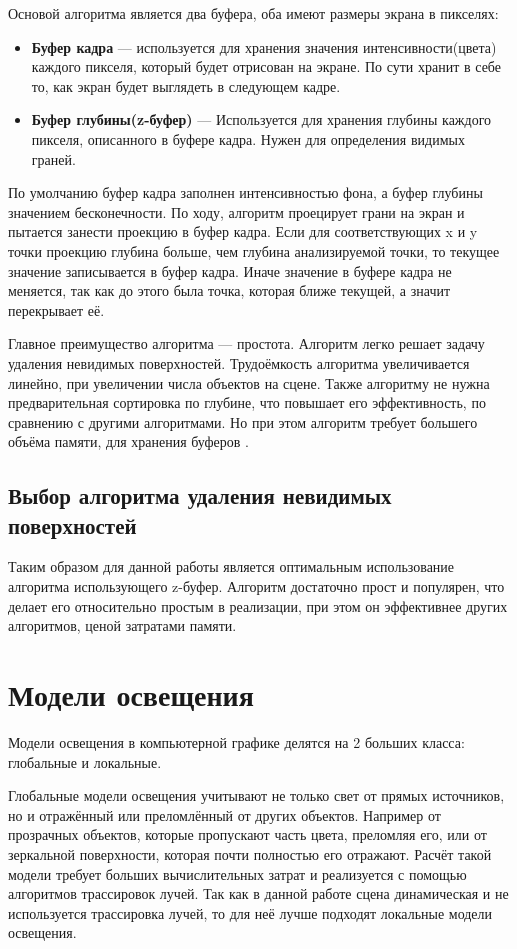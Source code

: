 Основой алгоритма является два буфера, оба имеют размеры экрана в пикселях:

\begin{itemize}
	\item \textbf{Буфер кадра} — используется для хранения значения интенсивности(цвета) каждого пикселя, который будет отрисован на экране. По сути хранит в себе то, как экран будет выглядеть в следующем кадре.
	\item \textbf{Буфер глубины(z-буфер)} — Используется для хранения глубины каждого пикселя, описанного в буфере кадра. Нужен для определения видимых граней.
\end{itemize}

По умолчанию буфер кадра заполнен интенсивностью фона, а буфер глубины значением бесконечности.
По ходу, алгоритм проецирует грани на экран и пытается занести проекцию в буфер кадра. Если для соответствующих x и y точки проекцию глубина больше, чем глубина анализируемой точки, то текущее значение записывается в буфер кадра. Иначе значение в буфере кадра не меняется, так как до этого была точка, которая ближе текущей, а значит перекрывает её.

Главное преимущество алгоритма — простота. Алгоритм легко решает задачу удаления невидимых поверхностей. Трудоёмкость алгоритма увеличивается линейно, при увеличении числа объектов на сцене. Также алгоритму не нужна предварительная сортировка по глубине, что повышает его эффективность, по сравнению с другими алгоритмами. Но при этом алгоритм требует большего объёма памяти, для хранения буферов \cite{rodgers}.

\subsection{Выбор алгоритма удаления невидимых поверхностей}


Таким образом для данной работы является оптимальным использование алгоритма использующего z-буфер. Алгоритм достаточно прост и популярен, что делает его относительно простым в реализации, при этом он эффективнее других алгоритмов, ценой затратами памяти.


\section{Модели освещения}
Модели освещения в компьютерной графике делятся на 2 больших класса: глобальные и локальные.

Глобальные модели освещения учитывают не только свет от прямых источников, но и отражённый или преломлённый от других объектов. Например от прозрачных объектов, которые пропускают часть цвета, преломляя его, или от зеркальной поверхности, которая почти полностью его отражают. Расчёт такой модели требует больших вычислительных затрат и реализуется с помощью алгоритмов трассировок лучей. Так как в данной работе сцена динамическая и не используется трассировка лучей, то для неё лучше подходят локальные модели освещения.

